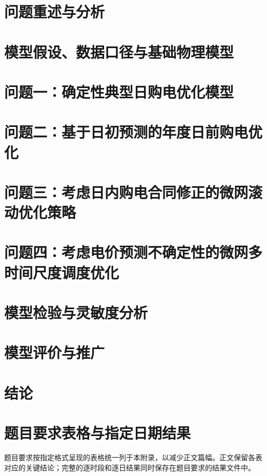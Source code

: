 \documentclass[12pt,a4paper,fontset=fandol]{ctexart}
\begin{document}
\newpage
\section{问题重述与分析}


\section{模型假设、数据口径与基础物理模型}


\section{问题一：确定性典型日购电优化模型}


\section{问题二：基于日初预测的年度日前购电优化}


\section{问题三：考虑日内购电合同修正的微网滚动优化策略}


\section{问题四：考虑电价预测不确定性的微网多时间尺度调度优化}


\section{模型检验与灵敏度分析}


\section{模型评价与推广}


\section{结论}


\iffalse
\newpage
\appendix
\section{题目要求表格与指定日期结果}
题目要求按指定格式呈现的表格统一列于本附录，以减少正文篇幅。正文保留各表对应的关键结论；完整的逐时段和逐日结果同时保存在题目要求的结果文件中。
\end{document}
